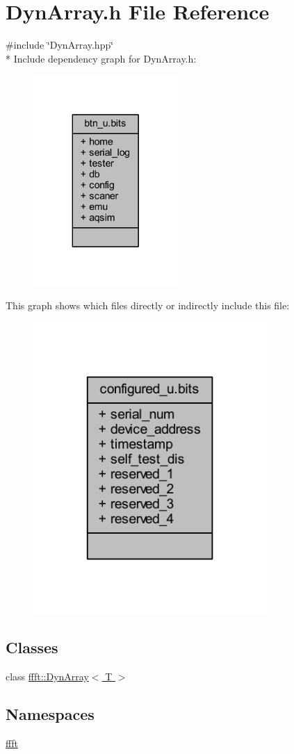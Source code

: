 \hypertarget{a00091}{\section{Dyn\+Array.\+h File Reference}
\label{a00091}
}
{\ttfamily \#include \char`\"{}Dyn\+Array.\+hpp\char`\"{}}\\*
Include dependency graph for Dyn\+Array.\+h\+:
\nopagebreak
\begin{figure}[H]
\begin{center}
\leavevmode
\includegraphics[width=156pt]{de/dbc/a00249}
\end{center}
\end{figure}
This graph shows which files directly or indirectly include this file\+:
\nopagebreak
\begin{figure}[H]
\begin{center}
\leavevmode
\includegraphics[width=252pt]{d0/da7/a00250}
\end{center}
\end{figure}
\subsection*{Classes}
\begin{DoxyCompactItemize}
\item 
class \hyperlink{a00007}{ffft\+::\+Dyn\+Array$<$ T $>$}
\end{DoxyCompactItemize}
\subsection*{Namespaces}
\begin{DoxyCompactItemize}
\item 
 \hyperlink{a00142}{ffft}
\end{DoxyCompactItemize}
